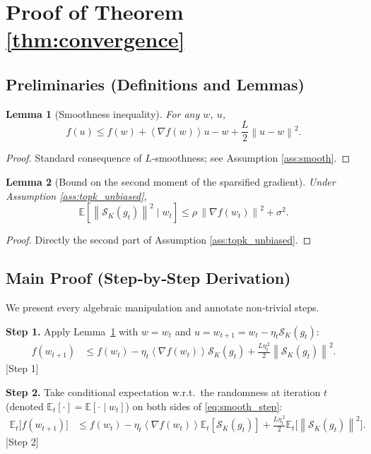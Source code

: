 \documentclass{article}
\newcommand{\EE}{\mathbb{E}}
\newcommand{\norm}[1]{\left\|#1\right\|}
\newcommand{\inner}[1]{\left\langle #1 \right\rangle}
\newcommand{\topk}[1]{\mathcal{S}_K(#1)}
\newtheorem{lemma}{Lemma}
\begin{document}
\section*{Proof of Theorem \ref{thm:convergence}}

\subsection*{Preliminaries (Definitions and Lemmas)}
\begin{lemma}[Smoothness inequality]\label{lem:smooth}
For any $w$, $u$,
\[
f(u) \le f(w) + \inner{\nabla f(w)}{u-w}
      + \frac{L}{2}\norm{u-w}^2 .
\]
\end{lemma}
\begin{proof}
Standard consequence of $L$‑smoothness; see Assumption \ref{ass:smooth}.
\end{proof}

\begin{lemma}[Bound on the second moment of the sparsified gradient]\label{lem:second_moment}
Under Assumption \ref{ass:topk_unbiased},
\[
\EE\!\left[\norm{\topk{g_t}}^2\mid w_t\right]
\le \rho\,\norm{\nabla f(w_t)}^2 + \sigma^2 .
\]
\end{lemma}
\begin{proof}
Directly the second part of Assumption \ref{ass:topk_unbiased}.
\end{proof}

\subsection*{Main Proof (Step‑by‑Step Derivation)}
We present every algebraic manipulation and annotate non‑trivial steps.

\noindent\textbf{Step 1.} Apply Lemma~\ref{lem:smooth} with $w=w_t$ and
$u=w_{t+1}=w_t-\eta_t\topk{g_t}$:
\begin{align}
f(w_{t+1})
&\le f(w_t) - \eta_t\inner{\nabla f(w_t)}{\topk{g_t}}
   + \frac{L\eta_t^{\,2}}{2}\norm{\topk{g_t}}^2 .
\label{eq:smooth_step}
\end{align}
[Step 1]

\noindent\textbf{Step 2.} Take conditional expectation w.r.t.\ the randomness at
iteration $t$ (denoted $\EE_t[\cdot]=\EE[\cdot\mid w_t]$) on both sides of
\eqref{eq:smooth_step}:
\begin{align}
\EE_t\!\bigl[f(w_{t+1})\bigr]
&\le f(w_t) - \eta_t\inner{\nabla f(w_t)}{\EE_t[\topk{g_t}]}
   + \frac{L\eta_t^{\,2}}{2}\EE_t\!\bigl[\norm{\topk{g_t}}^2\bigr].
\label{eq:exp_smooth}
\end{align}
[Step 2]
\end{document}
